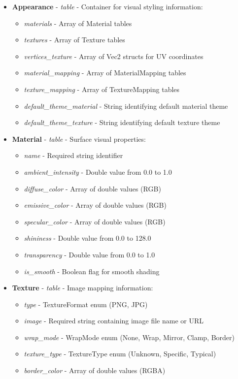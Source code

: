 \begin{itemize}
  \item \textbf{Appearance} - \textit{table} - Container for visual styling information:
    \begin{itemize}
      \item \textit{materials} - Array of Material tables
      \item \textit{textures} - Array of Texture tables
      \item \textit{vertices\_texture} - Array of Vec2 structs for UV coordinates
      \item \textit{material\_mapping} - Array of MaterialMapping tables
      \item \textit{texture\_mapping} - Array of TextureMapping tables
      \item \textit{default\_theme\_material} - String identifying default material theme
      \item \textit{default\_theme\_texture} - String identifying default texture theme
    \end{itemize}

  \item \textbf{Material} - \textit{table} - Surface visual properties:
    \begin{itemize}
      \item \textit{name} - Required string identifier
      \item \textit{ambient\_intensity} - Double value from 0.0 to 1.0
      \item \textit{diffuse\_color} - Array of double values (RGB)
      \item \textit{emissive\_color} - Array of double values (RGB)
      \item \textit{specular\_color} - Array of double values (RGB)
      \item \textit{shininess} - Double value from 0.0 to 128.0
      \item \textit{transparency} - Double value from 0.0 to 1.0
      \item \textit{is\_smooth} - Boolean flag for smooth shading
    \end{itemize}

  \item \textbf{Texture} - \textit{table} - Image mapping information:
    \begin{itemize}
      \item \textit{type} - TextureFormat enum (PNG, JPG)
      \item \textit{image} - Required string containing image file name or URL
      \item \textit{wrap\_mode} - WrapMode enum (None, Wrap, Mirror, Clamp, Border)
      \item \textit{texture\_type} - TextureType enum (Unknown, Specific, Typical)
      \item \textit{border\_color} - Array of double values (RGBA)
    \end{itemize}


\end{itemize}
